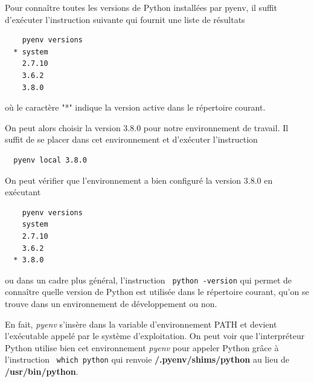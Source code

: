 \documentclass[twoside,a4paper,11pt,frenchb,openany]{report}
\begin{document}
Pour connaître toutes les versions de Python installées par pyenv, il suffit d'exécuter l'instruction suivante qui fournit une liste de résultats
\begin{verbatim}    pyenv versions
  * system
    2.7.10
    3.6.2
    3.8.0\end{verbatim}
où le caractère "*" indique la version active dans le répertoire courant.

On peut alors choisir la version 3.8.0 pour notre environnement de travail. Il suffit de se placer dans cet environnement et d'exécuter l'instruction
\begin{verbatim}  pyenv local 3.8.0\end{verbatim}

On peut vérifier que l'environnement a bien configuré la version 3.8.0 en exécutant

\begin{verbatim}    pyenv versions
    system
    2.7.10
    3.6.2
  * 3.8.0\end{verbatim}

ou dans un cadre plus général, l'instruction
\texttt{  python \textemdash-version} qui
permet de connaître quelle version de Python est utilisée dans le répertoire courant, qu'on se trouve dans un environnement de développement ou non.

En fait, \textit{pyenv} s'insère dans la variable d'environnement PATH et devient l'exécutable appelé par le système d'exploitation. On peut voir que l'interpréteur Python utilise bien cet environnement \textit{pyenv} pour appeler Python grâce à l'instruction
\texttt{   which python}
qui renvoie \textbf{\raisebox{-1ex}{\textasciitilde}/.pyenv/shims/python} au lieu de \textbf{/usr/bin/python}.
\end{document}
